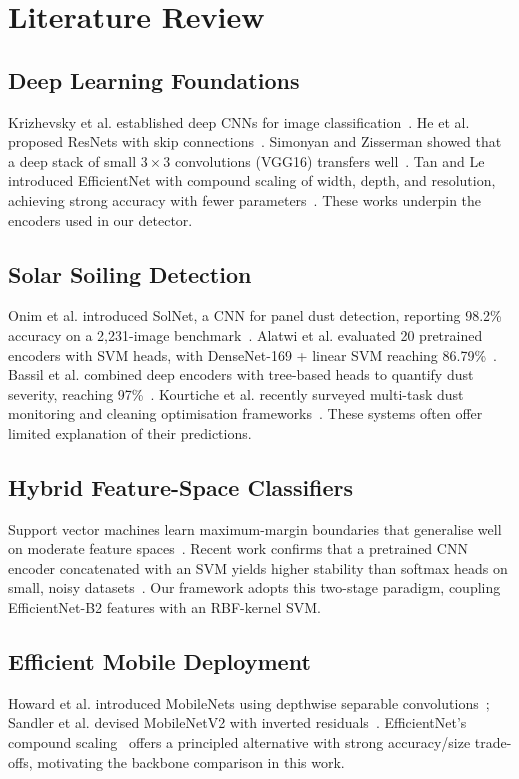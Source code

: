 \documentclass{IEEEtran}
\begin{document}
\section{Literature Review}

\subsection{Deep Learning Foundations}
Krizhevsky et al. established deep CNNs for image classification~\cite{krizhevsky2012imagenet}. He et al. proposed ResNets with skip connections~\cite{he2016deep}. Simonyan and Zisserman showed that a deep stack of small $3\times3$ convolutions (VGG16) transfers well~\cite{simonyan2015very}. Tan and Le introduced EfficientNet with compound scaling of width, depth, and resolution, achieving strong accuracy with fewer parameters~\cite{tan2019efficientnet}. These works underpin the encoders used in our detector.

\subsection{Solar Soiling Detection}
Onim et al. introduced SolNet, a CNN for panel dust detection, reporting 98.2\% accuracy on a 2,231-image benchmark~\cite{onim2023solnet}. Alatwi et al. evaluated 20 pretrained encoders with SVM heads, with DenseNet-169 + linear SVM reaching 86.79\%~\cite{alatwi2024deep}. Bassil et al. combined deep encoders with tree-based heads to quantify dust severity, reaching 97\%~\cite{bassil2025efficient}. Kourtiche et al. recently surveyed multi-task dust monitoring and cleaning optimisation frameworks~\cite{kourtiche2026}. These systems often offer limited explanation of their predictions.

\subsection{Hybrid Feature-Space Classifiers}
Support vector machines learn maximum-margin boundaries that generalise well on moderate feature spaces~\cite{cortes1995support}. Recent work confirms that a pretrained CNN encoder concatenated with an SVM yields higher stability than softmax heads on small, noisy datasets~\cite{bassil2025efficient}. Our framework adopts this two-stage paradigm, coupling EfficientNet-B2 features with an RBF-kernel SVM.

\subsection{Efficient Mobile Deployment}
Howard et al. introduced MobileNets using depthwise separable convolutions~\cite{howard2017mobilenets}; Sandler et al. devised MobileNetV2 with inverted residuals~\cite{sandler2018mobilenetv2}. EfficientNet's compound scaling~\cite{tan2019efficientnet} offers a principled alternative with strong accuracy/size trade-offs, motivating the backbone comparison in this work.
\end{document}
